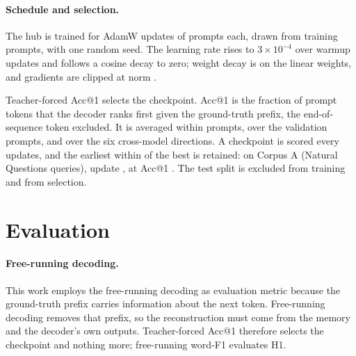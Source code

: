 \paragraph{Schedule and selection.} The hub is trained for  AdamW updates of  prompts each, drawn from  training prompts, with one random seed.
The learning rate rises to $3\times10^{-4}$ over  warmup updates and follows a cosine decay to zero; weight decay is  on the linear weights, and gradients are clipped at norm . %

Teacher-forced Acc@1 selects the checkpoint.
Acc@1 is the fraction of prompt tokens that the decoder ranks first given the ground-truth prefix, the end-of-sequence token excluded.
It is averaged within prompts, over the  validation prompts, and over the six cross-model directions.
A checkpoint is scored every  updates, and the earliest within  of the best is retained: on Corpus A (Natural Questions queries), update , at Acc@1 . %
The test split is excluded from training and from selection.


\section{Evaluation}\label{sec:hub:eval}

\paragraph{Free-running decoding.}
This work employs the free-running decoding as evaluation metric because the ground-truth prefix carries information about the next token.
Free-running decoding removes that prefix, so the reconstruction must come from the memory and the decoder's own outputs.
Teacher-forced Acc@1 therefore selects the checkpoint and nothing more; free-running word-F1 evaluates H1.


